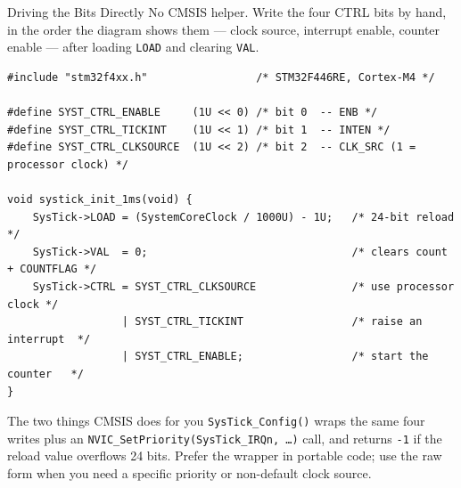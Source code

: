 \documentclass[9pt,aspectratio=169,xcolor=table]{beamer}
\begin{document}
\begin{frame}[fragile]{Driving the Bits Directly}
    \leavevmode
    {\small No CMSIS helper. Write the four CTRL bits by hand, in the order
    the diagram shows them --- clock source, interrupt enable, counter
    enable --- after loading \texttt{LOAD} and clearing \texttt{VAL}.}

    \vspace{2mm}
\begin{lstlisting}[style=myc, basicstyle=\ttfamily\footnotesize]
#include "stm32f4xx.h"                 /* STM32F446RE, Cortex-M4 */

#define SYST_CTRL_ENABLE     (1U << 0) /* bit 0  -- ENB */
#define SYST_CTRL_TICKINT    (1U << 1) /* bit 1  -- INTEN */
#define SYST_CTRL_CLKSOURCE  (1U << 2) /* bit 2  -- CLK_SRC (1 = processor clock) */

void systick_init_1ms(void) {
    SysTick->LOAD = (SystemCoreClock / 1000U) - 1U;   /* 24-bit reload */
    SysTick->VAL  = 0;                                /* clears count + COUNTFLAG */
    SysTick->CTRL = SYST_CTRL_CLKSOURCE               /* use processor clock */
                  | SYST_CTRL_TICKINT                 /* raise an interrupt  */
                  | SYST_CTRL_ENABLE;                 /* start the counter   */
}
\end{lstlisting}

    \vspace{2mm}
    \begin{block}{The two things CMSIS does for you}
        {\small \texttt{SysTick\_Config()} wraps the same four writes
        \alert{plus} an \texttt{NVIC\_SetPriority(SysTick\_IRQn, \ldots)}
        call, and returns \texttt{-1} if the reload value overflows 24
        bits. Prefer the wrapper in portable code; use the raw form when
        you need a specific priority or non-default clock source.}
    \end{block}
\end{frame}
\end{document}
